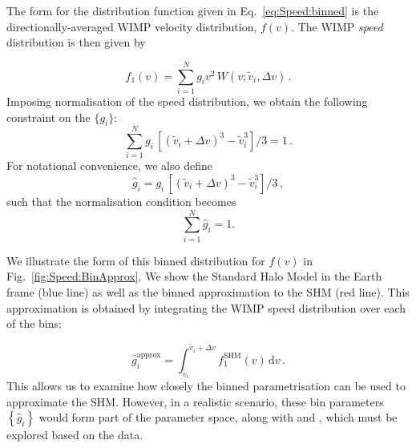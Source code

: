The form for the distribution function given in Eq.~\ref{eq:Speed:binned} is the directionally-averaged WIMP velocity distribution, $f(v)$. The WIMP \textit{speed} distribution is then given by

\begin{equation}
\label{eq:Speed:binned2}
f_1(v) = \sum_{i = 1}^N g_i v^2\, W(v;\tilde{v}_i,\Delta v) \,.
\end{equation}
Imposing normalisation of the speed distribution, we obtain the following constraint on the \(\{g_i\}\):
\begin{equation}
\label{eq:Speed:Normg}
\sum_{i = 1}^N g_i \, \left[(\tilde{v}_i + \Delta v)^3 - \tilde{v}_i^3\right]/3 = 1 \,.
\end{equation}
For notational convenience, we also define
\begin{equation}
\hat{g}_i = g_i \, \left[(\tilde{v}_i + \Delta v)^3 - \tilde{v}_i^3\right]/3 \,,
\end{equation}
such that the normalisation condition becomes
\begin{equation}
\label{eq:Speed:ghat}
\sum_{i = 1}^N \hat{g}_i = 1.
\end{equation}


We illustrate the form of this binned distribution for $f(v)$ in Fig.~\ref{fig:Speed:BinApprox}. We show the Standard Halo Model in the Earth frame (blue line) as well as the binned approximation to the SHM (red line). This approximation is obtained by integrating the WIMP speed distribution over each of the bins:

\begin{equation}
\label{eq:Speed:gapprox}
\hat{g}_i^\textrm{approx} = \int_{\tilde{v}_i}^{\tilde{v}_i + \Delta v} f_1^{\textrm{SHM}}(v) \, \mathrm{d}v\,.
\end{equation}
This allows us to examine how closely the binned parametrisation can be used to approximate the SHM. However, in a realistic scenario, these bin parameters $\left\{\hat{g}_i\right\}$ would form part of the parameter space, along with \mchi and \sigmapsi, which must be explored based on the data. 

